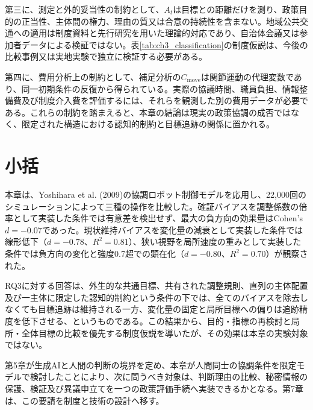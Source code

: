 第三に、測定と外的妥当性の制約として、$A_t$は目標との距離だけを測り、政策目的の正当性、主体間の権力、理由の質又は合意の持続性を含まない。地域公共交通への適用は制度資料と先行研究を用いた理論的対応であり、自治体会議又は参加者データによる検証ではない。表\ref{tab:ch3_classification}の制度仮説は、今後の比較事例又は実地実験で独立に検証する必要がある。

第四に、費用分析上の制約として、補足分析の$C_{\mathrm{move}}$は関節運動の代理変数であり、同一初期条件の反復から得られている。実際の協議時間、職員負担、情報整備費及び制度介入費を評価するには、それらを観測した別の費用データが必要である。これらの制約を踏まえると、本章の結論は現実の政策協調の成否ではなく、限定された構造における認知的制約と目標追跡の関係に置かれる。

\section{小括}
\label{sec:ch3_summary}

本章は、Yoshihara et al. (2009)の協調ロボット制御モデル\cite{yoshihara2009cooperative}を応用し、22,000回のシミュレーションによって三種の操作を比較した。確証バイアスを調整係数の倍率として実装した条件では有意差を検出せず、最大の負方向の効果量はCohen's $d=-0.07$であった。現状維持バイアスを変化量の減衰として実装した条件では線形低下（$d=-0.78$、$R^2=0.81$）、狭い視野を局所速度の重みとして実装した条件では負方向の変化と強度0.7超での顕在化（$d=-0.80$、$R^2=0.70$）が観察された。

RQ3に対する回答は、外生的な共通目標、共有された調整規則、直列の主体配置及び一主体に限定した認知的制約という条件の下では、全てのバイアスを除去しなくても目標追跡は維持される一方、変化量の固定と局所目標への偏りは追跡精度を低下させる、というものである。この結果から、目的・指標の再検討と局所・全体目標の比較を優先する制度仮説を導いたが、その効果は本章の実験対象ではない。

第5章が生成AIと人間の判断の境界を定め、本章が人間同士の協調条件を限定モデルで検討したことにより、次に問うべき対象は、判断理由の比較、秘密情報の保護、検証及び異議申立てを一つの政策評価手続へ実装できるかとなる。第7章は、この要請を制度と技術の設計へ移す。


\printbibliography[heading=subbibliography,title={章末参考文献}]

